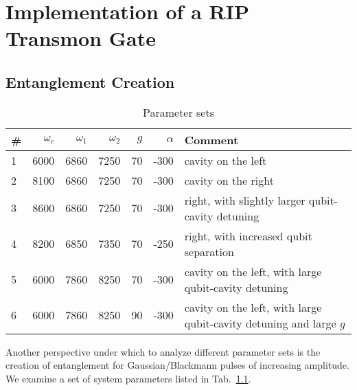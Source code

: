 \chapter{Implementation of a RIP Transmon Gate}
\label{chap:tmresults}


\section{Entanglement Creation}

\begin{table}[htbp]
  \centering
  \begin{tabular}{lrrrrrl}
  \toprule
  \#  &  {$\omega_c$} & {$\omega_1$} & {$\omega_2$} & {$g$} & {$\alpha$} & Comment\\
  \midrule
  1   &  6000         & 6860         & 7250         & 70    & -300       & cavity on the left \\
  2   &  8100         & 6860         & 7250         & 70    & -300       & cavity on the right \\
  3   &  8600         & 6860         & 7250         & 70    & -300       & right, with slightly larger qubit-cavity detuning\\
  4   &  8200         & 6850         & 7350         & 70    & -250       & right, with increased qubit separation \\
  5   &  6000         & 7860         & 8250         & 70    & -300       & cavity on the left, with large qubit-cavity detuning\\
  6   &  6000         & 7860         & 8250         & 90    & -300       & cavity on the left, with large qubit-cavity detuning and large $g$\\
  \bottomrule
  \end{tabular}
  \caption{Parameter sets}
  \label{tab:RIP_entang_params}
\end{table}

Another perspective under which to analyze different parameter sets is the
creation of entanglement for Gaussian/Blackmann pulses of increasing amplitude.
We examine a set of system parameters listed in Tab.~\ref{tab:RIP_entang_params}.


